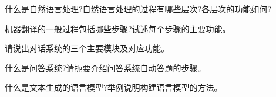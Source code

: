 \begin{think}
  什么是自然语言处理?自然语言处理的过程有哪些层次?各层次的功能如何?
\end{think}

\begin{think}
  机器翻译的一般过程包括哪些步骤?试述每个步骤的主要功能。
\end{think}
\begin{think}
  请说出对话系统的三个主要模块及对应功能。
\end{think}

\begin{think}
  什么是问答系统?请扼要介绍问答系统自动答题的步骤。
\end{think}

\begin{think}
  什么是文本生成的语言模型?举例说明构建语言模型的方法。
\end{think} 